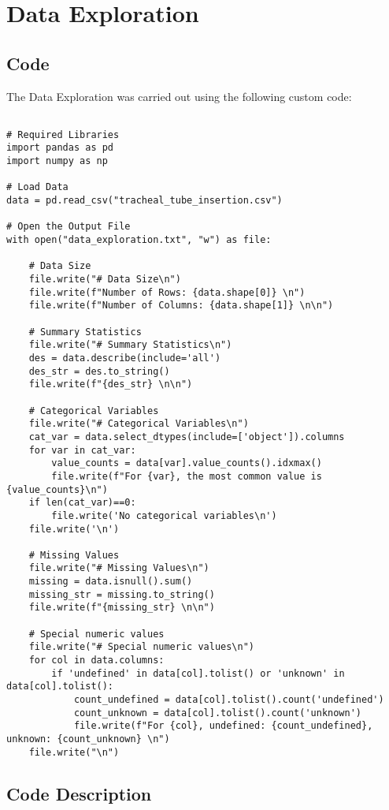 \documentclass[11pt]{article}
\begin{document}
\section{Data Exploration}
\subsection{{Code}}
The Data Exploration was carried out using the following custom code:

\begin{verbatim}

# Required Libraries
import pandas as pd
import numpy as np

# Load Data
data = pd.read_csv("tracheal_tube_insertion.csv")

# Open the Output File
with open("data_exploration.txt", "w") as file:

    # Data Size
    file.write("# Data Size\n")
    file.write(f"Number of Rows: {data.shape[0]} \n")
    file.write(f"Number of Columns: {data.shape[1]} \n\n")
    
    # Summary Statistics
    file.write("# Summary Statistics\n")
    des = data.describe(include='all')
    des_str = des.to_string()
    file.write(f"{des_str} \n\n")
    
    # Categorical Variables
    file.write("# Categorical Variables\n")
    cat_var = data.select_dtypes(include=['object']).columns
    for var in cat_var:
        value_counts = data[var].value_counts().idxmax()
        file.write(f"For {var}, the most common value is {value_counts}\n")
    if len(cat_var)==0:
        file.write('No categorical variables\n')
    file.write('\n')
    
    # Missing Values
    file.write("# Missing Values\n")
    missing = data.isnull().sum()
    missing_str = missing.to_string()
    file.write(f"{missing_str} \n\n")

    # Special numeric values
    file.write("# Special numeric values\n")
    for col in data.columns:
        if 'undefined' in data[col].tolist() or 'unknown' in data[col].tolist():
            count_undefined = data[col].tolist().count('undefined')
            count_unknown = data[col].tolist().count('unknown')
            file.write(f"For {col}, undefined: {count_undefined}, unknown: {count_unknown} \n")
    file.write("\n")

\end{verbatim}

\subsection{Code Description}
\end{document}
